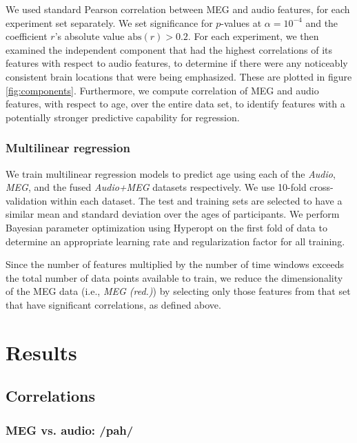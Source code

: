 \documentclass[a4paper]{article}
\begin{document}
We used standard Pearson correlation between MEG and audio features, for each experiment set separately. We set significance for $p$-values at $\alpha = 10^{-4}$ and the coefficient $r$'s absolute value $\text{abs}(r) > 0.2$. For each experiment, we then examined the independent component that had the highest correlations of its features with respect to audio features, to determine if there were any noticeably consistent brain locations that were being emphasized. These are plotted in figure \ref{fig:components}. Furthermore, we compute correlation of MEG and audio features, with respect to age, over the entire data set, to identify features with a potentially stronger predictive capability for regression.

\subsubsection{Multilinear regression}

We train multilinear regression models to predict age using each of the \textit{Audio}, \textit{MEG}, and the fused \textit{Audio+MEG} datasets respectively. We use 10-fold cross-validation within each dataset. The test and training sets are selected to have a similar mean and standard deviation over the ages of participants. We perform Bayesian parameter optimization using Hyperopt \cite{Bergstra2013} on the first fold of data to determine an appropriate learning rate and regularization factor for all training. %

Since the number of features multiplied by the number of time windows exceeds the total number of data points available to train, we reduce the dimensionality of the MEG data (i.e., {\em MEG (red.)}) by selecting only those features from that set that have significant correlations, as defined above.

\section{Results}

\subsection{Correlations}

\subsubsection{MEG vs. audio: /pah/}
\end{document}
